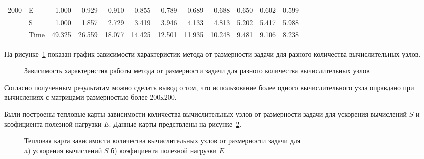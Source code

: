 \begin{table}[H]
\begin{tabular}{|l|l|rrrrrrrrrr|}
        \cline{1-12}
        \multirow[t]{3}{*}{2000} & E    & 1.000  & 0.929  & 0.910  & 0.855  & 0.789  & 0.689  & 0.688  & 0.650 & 0.602 & 0.599 \\
        & S    & 1.000  & 1.857  & 2.729  & 3.419  & 3.946  & 4.133  & 4.813  & 5.202 & 5.417 & 5.988 \\
        & Time & 49.325 & 26.559 & 18.077 & 14.425 & 12.501 & 11.935 & 10.248 & 9.481 & 9.106 & 8.238 \\
        \cline{1-12}
        \hline
    \end{tabular}
\end{table}


На рисунке~\ref{fig:graph} показан график зависимости характеристик метода от размерности задачи для разного количества вычислительных узлов.

\begin{figure}[H]
    \centering
    
    
    \caption{Зависимость характеристик работы метода от размерности задачи для разного количества вычислительных узлов}
    \label{fig:graph}
\end{figure}

Согласно полученным результатам можно сделать вывод о том, что использование более одного вычислительного узла оправдано при вычислениях с матрицами размерностью более 200x200.


Были построены тепловые карты зависимости количества вычислительных узлов от размерности задачи для ускорения вычислений $S$ и коэфициента полезной нагрузки $E$.
Данные карты предствлены на рисунке~\ref{fig:heatmap_s}.

\begin{figure}[H]
    \centering
    \begin{minipage}[h]{0.49\textwidth}
    \end{minipage}
    \hfill
    \begin{minipage}[h]{0.49\textwidth}
    \end{minipage}
    \caption{Тепловая карта зависимости количества вычислительных узлов от размерности задачи для \\ a) ускорения вычислений  $S$  б) коэфициента полезной нагрузки  $E$   }
    \label{fig:heatmap_s}
\end{figure}


